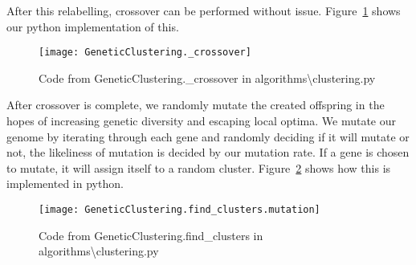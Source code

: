 \noindent
After this relabelling, crossover can be performed without issue.
Figure~\ref{fig:GeneticClustering._crossover} shows our python implementation of this.
\begin{figure}[H]
    \centering
    \texttt{[image: GeneticClustering.\_crossover]}
    \caption{Code from GeneticClustering.\_crossover in algorithms\textbackslash clustering.py}
    \label{fig:GeneticClustering._crossover}
\end{figure}

After crossover is complete, we randomly mutate the created offspring in the hopes of increasing genetic diversity
and escaping local optima.
We mutate our genome by iterating through each gene and randomly deciding if it will mutate or not, the likeliness
of mutation is decided by our mutation rate.
If a gene is chosen to mutate, it will assign itself to a random cluster.
Figure~\ref{fig:GeneticClustering.find_clusters.mutation} shows how this is implemented in python.
\begin{figure}[H]
    \centering
    \texttt{[image: GeneticClustering.find\_clusters.mutation]}
    \caption{Code from GeneticClustering.find\_clusters in algorithms\textbackslash clustering.py}
    \label{fig:GeneticClustering.find_clusters.mutation}
\end{figure}

